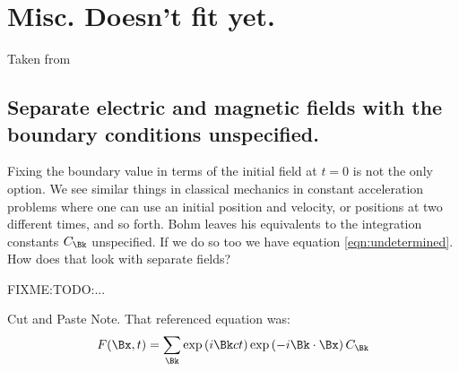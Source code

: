 \documentclass{article}
\title{}
\author{Peeter Joot}
\date{ Feb dd, 2009.  Last Revision: $Date: 2009/02/09 13:37:49 $ }
\begin{document}
\maketitle{}

\tableofcontents

\section{}

\section{ Misc.  Doesn't fit yet. }

Taken from \cite{PJFourierVacuum}


\subsection{ Separate electric and magnetic fields with the boundary conditions unspecified. }

Fixing the boundary value in terms of the initial field at $t=0$ is not the only option.  We see similar things in classical mechanics in constant acceleration problems where one can use an initial position and velocity, or positions at two different times, and so forth.  Bohm leaves his equivalents to the integration constants $C_{\Bk}$ unspecified.  If we do so too we have equation \ref{eqn:undetermined}.  How does that look with separate fields?

FIXME:TODO:...  

Cut and Paste Note.  That referenced equation was:
\begin{align}\label{eqn:undetermined}
F(\Bx,t) = \sum_{\Bk} 
\exp\left(i \Bk c t \right) 
\exp\left(-i \Bk \cdot \Bx \right) 
C_{\Bk} 
\end{align}



\end{document}
